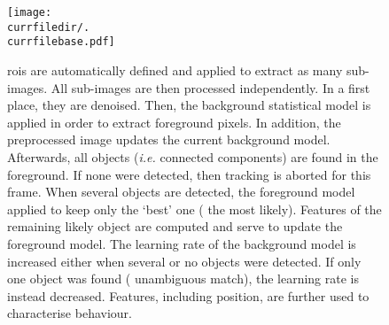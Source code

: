 \begin{figure}[h!]
  \centering   
  	\centering   
  \begin{minipage}[t]{0.5\textwidth}
  	\vspace{0pt}
  	\texttt{[image: \\currfiledir/.\\currfilebase.pdf]}
  \end{minipage}\hfill
  \begin{minipage}[t]{0.45\textwidth}
  	\vspace{0pt}
  \caption[Flowchart of the video tracking algorithm]{
	\glspl{roi} are automatically defined and applied to extract as many sub-images.
   All sub-images are then processed independently.
In a first place, they are denoised. Then, the background statistical model is applied in order to extract foreground pixels.
In addition, the preprocessed image updates the current background model.
Afterwards, all objects (\emph{i.e.} connected components) are found in the foreground.
If none were detected, then tracking is aborted for this frame.
When several objects are detected, the foreground model applied to keep only the `best' one (\ie{} the most likely).
Features of the remaining likely object are computed and serve to update the foreground model.
The learning rate of the background model is increased either when several or no objects were detected.
If only one object was found (\ie{} unambiguous match), the learning rate is instead decreased.
Features, including position, are further used to characterise behaviour.
  \label{fig:\currfilebase}
  }
 \end{minipage}
\end{figure}





